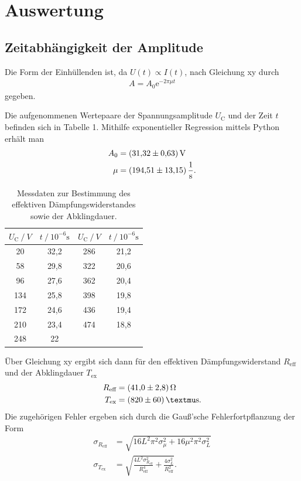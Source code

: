 \section{Auswertung}
\label{sec:Auswertung}

\subsection{Zeitabhängigkeit der Amplitude}

Die Form der Einhüllenden ist, da $\mathit{U(t) \propto I(t)}$, nach Gleichung xy durch
\begin{align*}
A = A_\text{0} \mathrm{e}^{-2 \pi \mu t}
\end{align*}
gegeben.


Die aufgenommenen Wertepaare der Spannungsamplitude $U_\text{C}$ und der Zeit $t$
befinden sich in Tabelle 1. Mithilfe exponentieller Regression mittels Python erhält man
\begin{align*}
A_\text{0} &= (\num{31,32 +- 0,63})\,\mathrm{V} \\
\mu &= (\num{194.51 +- 13.15})\,\mathrm{\frac{1}{s}} .
\end{align*}

\begin{table}[H]
\centering
\caption{Messdaten zur Bestimmung des effektiven Dämpfungswiderstandes sowie der Abklingdauer.}
\label{tab:some_data}
\begin{tabular}{c c c c}
\toprule
$U_\text{C} \:/\: V$ & $t \:/\: 10^{-6}\si{\second}$ & $U_\text{C} \:/\: V$ & $t \:/\: 10^{-6}\si{\second}$\\
\midrule
20  & 32,2 & 286 & 21,2\\
58  & 29,8 & 322 & 20,6\\
96  & 27,6 & 362 & 20,4\\
134 & 25,8 & 398 & 19,8\\
172 & 24,6 & 436 & 19,4\\
210 & 23,4 & 474 & 18,8\\
248 & 22 \\
\bottomrule
\end{tabular}
\end{table}

Über Gleichung xy ergibt sich dann für den effektiven Dämpfungswiderstand
$R_\text{eff}$ und der Abklingdauer $T_\text{ex}$ 
\begin{align*}
R_\text{eff} &= (\num{41.0 +- 2.8})\,\si{\ohm}\\
T_\text{ex} &= (\num{820 +- 60})\,\mathrm{µs}.
\end{align*}
Die zugehörigen Fehler ergeben sich durch die Gauß'sche Fehlerfortpflanzung der Form
\begin{align*}
\sigma_{R_\text{eff}} &= \sqrt{ 16 L^{2} \pi^{2} \sigma_{\mu}^{2} + 16 \mu^{2} \pi^{2} \sigma_{L}^{2}} \\
\sigma_{T_\text{ex}} &= \sqrt{\frac{4 L^{2} \sigma_{R_\text{eff}}^{2}}{R_\text{eff}^{4}} + \frac{4 \sigma_{L}^{2}}{R_\text{eff}^{2}}}.
\end{align*}


